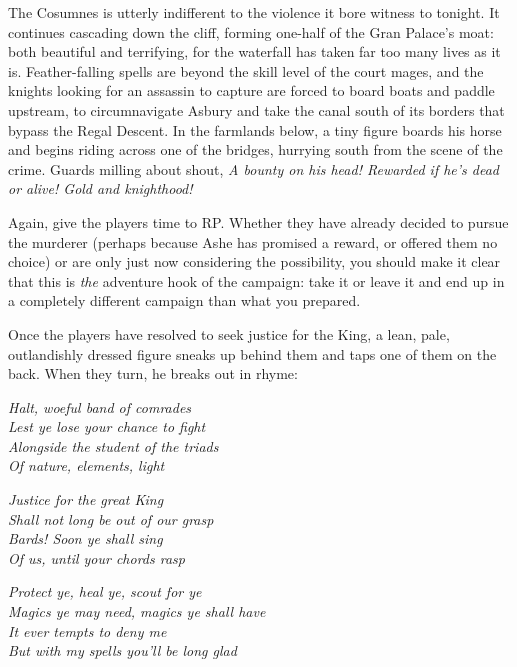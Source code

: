 \documentclass{report}
\theoremstyle{definition}
\begin{document}
\begin{displayquote}The Cosumnes is utterly indifferent to the violence it bore witness to tonight.  It continues cascading down the cliff, forming one-half of the Gran Palace's moat: both beautiful and terrifying, for the waterfall has taken far too many lives as it is.  Feather-falling spells are beyond the skill level of the court mages, and the knights looking for an assassin to capture are forced to board boats and paddle upstream, to circumnavigate Asbury and take the canal south of its borders that bypass the Regal Descent.  In the farmlands below, a tiny figure boards his horse and begins riding across one of the bridges, hurrying south from the scene of the crime. Guards milling about shout, \textit{A bounty on his head! Rewarded if he's dead or alive! Gold and knighthood!}
\end{displayquote}

Again, give the players time to RP. Whether they have already decided to pursue the murderer (perhaps because Ashe has promised a reward, or offered them no choice) or are only just now considering the possibility, you should make it clear that this is \textit{the} adventure hook of the campaign: take it or leave it and end up in a completely different campaign than what you prepared.

Once the players have resolved to seek justice for the King, a lean, pale, outlandishly dressed figure sneaks up behind them and taps one of them on the back. When they turn, he breaks out in rhyme:

\begin{displayquote}
\textit{Halt, woeful band of comrades\\
Lest ye lose your chance to fight\\
Alongside the student of the triads\\
Of nature, elements, light}

\textit{Justice for the great King\\
Shall not long be out of our grasp\\
Bards! Soon ye shall sing\\
Of us, until your chords rasp}

\textit{Protect ye, heal ye, scout for ye\\
Magics ye may need, magics ye shall have\\
It ever tempts to deny me\\
But with my spells you'll be long glad
}
\end{displayquote}
\end{document}
